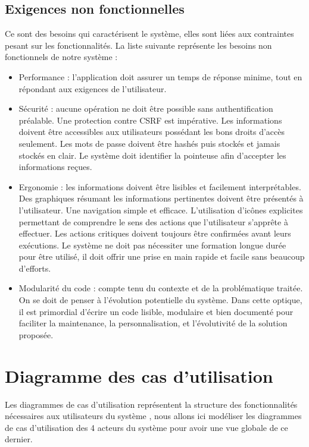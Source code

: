 \subsection{Exigences non fonctionnelles}
Ce sont des besoins qui caractérisent le système, elles sont liées aux
contraintes pesant sur les fonctionnalités. La liste suivante représente les
besoins non fonctionnels de notre système :

\begin{itemize}
    \item [\textbullet] Performance : l’application doit assurer un temps de
        réponse minime, tout en répondant aux exigences de l’utilisateur.
    
    \item [\textbullet] Sécurité : aucune opération ne doit être possible sans
        authentification préalable. Une protection contre CSRF est impérative.
        Les informations doivent être accessibles aux utilisateurs possédant les
        bons droits d’accès seulement. Les mots de passe doivent être hashés
        puis stockés et jamais stockés en clair. Le système doit identifier la
        pointeuse afin d’accepter les informations reçues.
    
    \item [\textbullet] Ergonomie : les informations doivent être lisibles et
        facilement interprétables. Des graphiques résumant les informations
        pertinentes doivent être présentés à l’utilisateur. Une navigation
        simple et efficace. L’utilisation d’icônes explicites permettant de
        comprendre le sens des actions que l’utilisateur s’apprête à effectuer.
        Les actions critiques doivent toujours être confirmées avant leurs
        exécutions. Le système ne doit pas nécessiter une formation longue durée
        pour être utilisé, il doit offrir une prise en main rapide et facile
        sans beaucoup d’efforts.
    
     \item [\textbullet] Modularité du code : compte tenu du contexte et de la
         problématique traitée. On se doit de penser à l’évolution potentielle
         du système. Dans cette optique, il est primordial d’écrire un code
         lisible, modulaire et bien documenté pour faciliter la maintenance, la
         personnalisation, et l’évolutivité de la solution proposée.
\end{itemize}
                

\section{Diagramme des cas d'utilisation}
Les diagrammes de cas d’utilisation représentent la structure des
fonctionnalités nécessaires aux utilisateurs du système \cite{6}, nous allons
ici modéliser les diagrammes de cas d’utilisation des 4 acteurs du système pour
avoir une vue globale de ce dernier.

